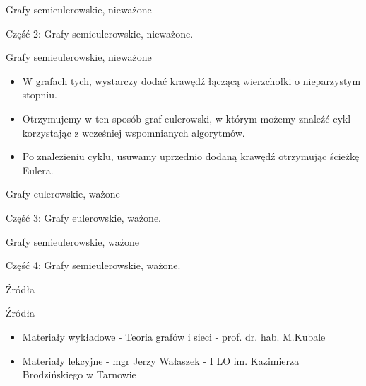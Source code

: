 \documentclass[polish,envcountsect,10pt]{beamer}
\begin{document}
\begin{frame}{Grafy semieulerowskie, nieważone}
    \begin{block}{}
        Część 2: Grafy semieulerowskie, nieważone.
    \end{block}
\end{frame}

\begin{frame}{Grafy semieulerowskie, nieważone}
    \begin{block}{}
        \begin{itemize}
            \item W grafach tych, wystarczy dodać krawędź łączącą wierzchołki o nieparzystym stopniu.
            \item Otrzymujemy w ten sposób graf eulerowski, w którym możemy znaleźć cykl korzystając z wcześniej wspomnianych algorytmów.
            \item Po znalezieniu cyklu, usuwamy uprzednio dodaną krawędź otrzymując ścieżkę Eulera.
        \end{itemize}
    \end{block}
\end{frame}

\begin{frame}{Grafy eulerowskie, ważone}
    \begin{block}{}
        Część 3: Grafy eulerowskie, ważone.
    \end{block}
\end{frame}

\begin{frame}{Grafy semieulerowskie, ważone}
    \begin{block}{}
        Część 4: Grafy semieulerowskie, ważone.
    \end{block}
\end{frame}

\begin{frame}{Źródła}
    \begin{block}{Źródła}
        \begin{itemize}
            \item Materiały wykładowe - Teoria grafów i sieci - prof. dr. hab. M.Kubale
            \item Materiały lekcyjne - mgr Jerzy Wałaszek - I LO im. Kazimierza Brodzińskiego w Tarnowie
        \end{itemize}
    \end{block}
\end{frame}
\end{document}
